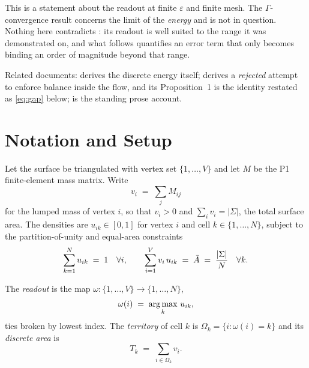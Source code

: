\documentclass[11pt,a4paper]{article}
\begin{document}
\begin{remark}
This is a statement about the readout at finite $\varepsilon$ and finite mesh. The
$\Gamma$-convergence result concerns the limit of the \emph{energy} and is not in
question. Nothing here contradicts \cite{bogosel2017partitions}: its readout is
well suited to the range it was demonstrated on, and what follows quantifies an
error term that only becomes binding an order of magnitude beyond that range.
\end{remark}

Related documents:  derives
the discrete energy itself;  derives a
\emph{rejected} attempt to enforce balance inside the flow, and its Proposition~1
is the identity restated as \eqref{eq:gap} below;
 is the standing
prose account.

\section{Notation and Setup}

Let the surface be triangulated with vertex set $\{1,\dots,V\}$ and let
$M$ be the P1 finite-element mass matrix. Write
\begin{equation}
  v_i \;=\; \sum_{j} M_{ij}
  \label{eq:lumped}
\end{equation}
for the lumped mass of vertex $i$, so that $v_i > 0$ and
$\sum_i v_i = |\Sigma|$, the total surface area. The densities are
$u_{ik} \in [0,1]$ for vertex $i$ and cell $k \in \{1,\dots,N\}$, subject to the
partition-of-unity and equal-area constraints
\begin{equation}
  \sum_{k=1}^{N} u_{ik} \;=\; 1 \quad \forall i,
  \qquad
  \sum_{i=1}^{V} v_i\, u_{ik} \;=\; \bar{A} \;=\; \frac{|\Sigma|}{N}
  \quad \forall k .
  \label{eq:constraints}
\end{equation}

\begin{defn}
The \emph{readout} is the map $\omega : \{1,\dots,V\} \to \{1,\dots,N\}$,
\begin{equation}
  \omega(i) \;=\; \operatorname*{arg\,max}_k \, u_{ik},
  \label{eq:wta}
\end{equation}
ties broken by lowest index. The \emph{territory} of cell $k$ is
$\Omega_k = \{ i : \omega(i) = k \}$ and its \emph{discrete area} is
\begin{equation}
  T_k \;=\; \sum_{i \in \Omega_k} v_i .
  \label{eq:territory}
\end{equation}
\end{defn}
\end{document}
